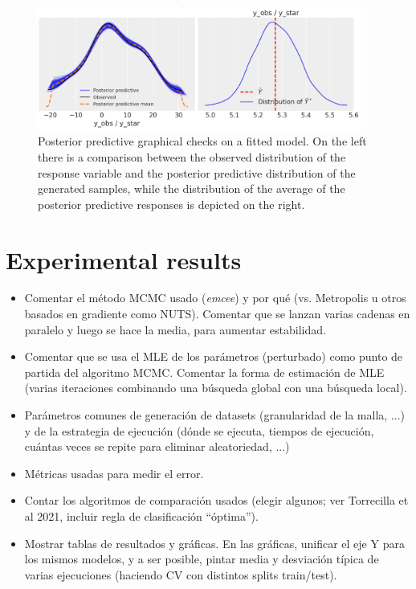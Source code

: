 \documentclass[ba]{imsart}
\numberwithin{equation}{section}
\theoremstyle{plain}
\newenvironment{comment}
{
\noindent \em \color{red}
}
{
\color{black}
}
\begin{document}
\begin{figure}[h]
  \centering
  \includegraphics[width=0.95\textwidth]{img/ppc_lin}
  \caption{Posterior predictive graphical checks on a fitted model. On the left there is a comparison between the observed distribution of the response variable and the posterior predictive distribution of the generated samples, while the distribution of the average of the posterior predictive responses is depicted on the right.}\label{fig:ppc}
\end{figure}

\section{Experimental results}\label{sec:results}
\begin{comment}
  \begin{itemize}
    \item Comentar el método MCMC usado (\textit{emcee}) y por qué (vs. Metropolis u otros basados en gradiente como NUTS). Comentar que se lanzan varias cadenas en paralelo y luego se hace la media, para aumentar estabilidad.
    \item Comentar que se usa el MLE de los parámetros (perturbado) como punto de partida del algoritmo MCMC. Comentar la forma de estimación de MLE (varias iteraciones combinando una búsqueda global con una búsqueda local).
    \item Parámetros comunes de generación de datasets (granularidad de la malla, ...) y de la estrategia de ejecución (dónde se ejecuta, tiempos de ejecución, cuántas veces se repite para eliminar aleatoriedad, ...)
    \item Métricas usadas para medir el error.
    \item Contar los algoritmos de comparación usados (elegir algunos; ver Torrecilla et al 2021, incluir regla de clasificación ``óptima'').
    \item Mostrar tablas de resultados y gráficas. En las gráficas, unificar el eje Y para los mismos modelos, y a ser posible, pintar media y desviación típica de varias ejecuciones (haciendo CV con distintos splits train/test).
\end{itemize}
\end{comment}
\end{document}
